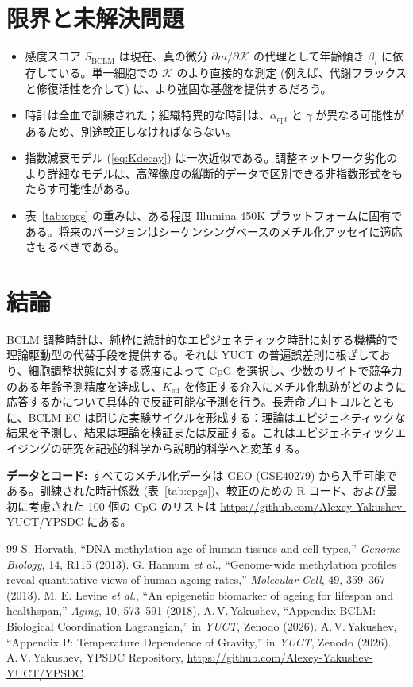 \documentclass[12pt,a4paper]{ltjsarticle}
\newcommand{\REL}{\mathcal{K}}          %
\begin{document}
	\section{限界と未解決問題}
	\label{sec:limitations}
	\begin{itemize}
		\item 感度スコア \(S_{\mathrm{BCLM}}\) は現在、真の微分 \(\partial m/\partial \REL\) の代理として年齢傾き \(\beta_i\) に依存している。単一細胞での \(\REL\) のより直接的な測定 (例えば、代謝フラックスと修復活性を介して) は、より強固な基盤を提供するだろう。
		\item 時計は全血で訓練された；組織特異的な時計は、\(\alpha_{\mathrm{epi}}\) と \(\gamma\) が異なる可能性があるため、別途較正しなければならない。
		\item 指数減衰モデル (\ref{eq:Kdecay}) は一次近似である。調整ネットワーク劣化のより詳細なモデルは、高解像度の縦断的データで区別できる非指数形式をもたらす可能性がある。
		\item 表~\ref{tab:cpgs} の重みは、ある程度 Illumina 450K プラットフォームに固有である。将来のバージョンはシーケンシングベースのメチル化アッセイに適応させるべきである。
	\end{itemize}
	
	\section{結論}
	\label{sec:conclusion}
	BCLM 調整時計は、純粋に統計的なエピジェネティック時計に対する機構的で理論駆動型の代替手段を提供する。それは YUCT の普遍誤差則に根ざしており、細胞調整状態に対する感度によって CpG を選択し、少数のサイトで競争力のある年齢予測精度を達成し、\(K_{\mathrm{eff}}\) を修正する介入にメチル化軌跡がどのように応答するかについて具体的で反証可能な予測を行う。長寿命プロトコルとともに、BCLM-EC は閉じた実験サイクルを形成する：理論はエピジェネティックな結果を予測し、結果は理論を検証または反証する。これはエピジェネティックエイジングの研究を記述的科学から説明的科学へと変革する。
	
	\vspace{0.5cm}
	\noindent\textbf{データとコード:} すべてのメチル化データは GEO (GSE40279) から入手可能である。訓練された時計係数 (表~\ref{tab:cpgs})、較正のための R コード、および最初に考慮された 100 個の CpG のリストは \url{https://github.com/Alexey-Yakushev-YUCT/YPSDC} にある。
	
	\begin{thebibliography}{99}
		 S. Horvath, ``DNA methylation age of human tissues and cell types,'' \emph{Genome Biology}, 14, R115 (2013).
		 G. Hannum \emph{et al.}, ``Genome-wide methylation profiles reveal quantitative views of human ageing rates,'' \emph{Molecular Cell}, 49, 359--367 (2013).
		 M. E. Levine \emph{et al.}, ``An epigenetic biomarker of ageing for lifespan and healthspan,'' \emph{Aging}, 10, 573--591 (2018).
		 A.\,V.\,Yakushev, ``Appendix BCLM: Biological Coordination Lagrangian,'' in \emph{YUCT}, Zenodo (2026).
		 A.\,V.\,Yakushev, ``Appendix P: Temperature Dependence of Gravity,'' in \emph{YUCT}, Zenodo (2026).
		 A.\,V.\,Yakushev, YPSDC Repository, \url{https://github.com/Alexey-Yakushev-YUCT/YPSDC}.
	\end{thebibliography}
	
\end{document}
